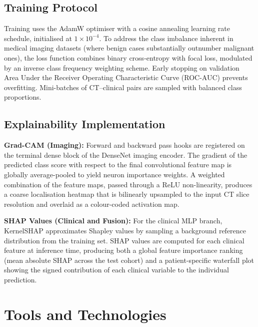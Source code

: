 {\subsection{Training Protocol}

Training uses the AdamW optimiser with a cosine annealing learning rate schedule, initialised at $1 \times 10^{-4}$. To address the class imbalance inherent in medical imaging datasets (where benign cases substantially outnumber malignant ones), the loss function combines binary cross-entropy with focal loss, modulated by an inverse class frequency weighting scheme. Early stopping on validation Area Under the Receiver Operating Characteristic Curve (ROC-AUC) prevents overfitting. Mini-batches of CT--clinical pairs are sampled with balanced class proportions.

\subsection{Explainability Implementation}

\textbf{Grad-CAM (Imaging):} Forward and backward pass hooks are registered on the terminal dense block of the DenseNet imaging encoder. The gradient of the predicted class score with respect to the final convolutional feature map is globally average-pooled to yield neuron importance weights. A weighted combination of the feature maps, passed through a ReLU non-linearity, produces a coarse localisation heatmap that is bilinearly upsampled to the input CT slice resolution and overlaid as a colour-coded activation map.

\textbf{SHAP Values (Clinical and Fusion):} For the clinical MLP branch, KernelSHAP approximates Shapley values by sampling a background reference distribution from the training set. SHAP values are computed for each clinical feature at inference time, producing both a global feature importance ranking (mean absolute SHAP across the test cohort) and a patient-specific waterfall plot showing the signed contribution of each clinical variable to the individual prediction.


\section{Tools and Technologies}

}
